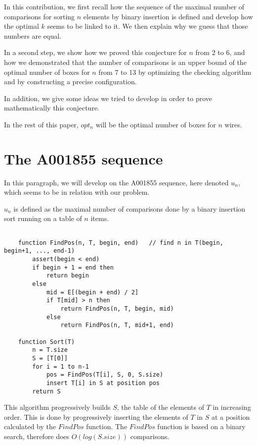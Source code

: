 \documentclass[11pt, a4paper]{article}
\begin{document}
In this contribution, we first recall how the sequence of the maximal number of
comparisons for sorting $n$ elements by binary insertion is defined and develop
how the optimal $k$ seems to be linked to it.  We then explain why we guess that
those numbers are equal.

In a second step, we show how we proved this conjecture for $n$ from 2 to 6, and
how we demonstrated that the number of comparisons is an upper bound of the
optimal number of boxes for $n$ from 7 to 13 by optimizing the checking
algorithm and by constructing a precise configuration.

In addition, we give some ideas we tried to develop in order to prove
mathematically this conjecture.

In the rest of this paper, $opt_n$ will be the optimal number of boxes for $n$
wires.


\section{The A001855 sequence}

In this paragraph, we will develop on the A001855 sequence, here denoted $u_n$,
which seems to be in relation with our problem.

$u_n$ is defined as the maximal number of comparisons done by a binary
insertion sort running on a table of $n$ items.

\begin{verbatim}

    function FindPos(n, T, begin, end)   // find n in T(begin, begin+1, ..., end-1)
        assert(begin < end)
        if begin + 1 = end then
            return begin
        else
            mid = E[(begin + end) / 2]
            if T[mid] > n then
                return FindPos(n, T, begin, mid)
            else
                return FindPos(n, T, mid+1, end)
  
    function Sort(T)
        n = T.size
        S = [T[0]]
        for i = 1 to n-1
            pos = FindPos(T[i], S, 0, S.size)
            insert T[i] in S at position pos
        return S

\end{verbatim}

This algorithm progressively builds $S$, the table of the elements of $T$ in
increasing order. This is done by progressively inserting the elements of $T$ in
$S$ at a position calculated by the $FindPos$ function. The $FindPos$ function
is based on a binary search, therefore does $O(log(S.size))$ comparisons.
\end{document}
